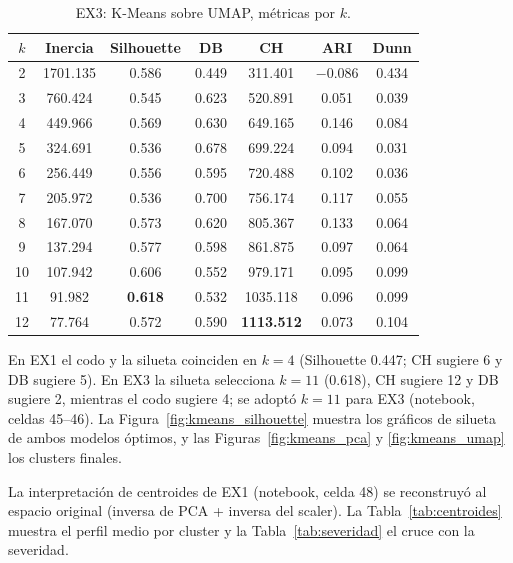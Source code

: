 \documentclass[11pt,a4paper]{article}
\begin{document}
\begin{table}[H]
  \centering
  \caption{EX3: K-Means sobre UMAP, métricas por $k$.}
  \label{tab:kmeans_umap}
  \footnotesize
  \begin{tabular}{@{}ccccccc@{}}
    \toprule
    $k$ & \textbf{Inercia} & \textbf{Silhouette} & \textbf{DB} & \textbf{CH} & \textbf{ARI} & \textbf{Dunn} \\
    \midrule
    2 & 1701.135 & 0.586 & 0.449 & 311.401 & $-0.086$ & 0.434 \\
    3 & 760.424 & 0.545 & 0.623 & 520.891 & 0.051 & 0.039 \\
    4 & 449.966 & 0.569 & 0.630 & 649.165 & 0.146 & 0.084 \\
    5 & 324.691 & 0.536 & 0.678 & 699.224 & 0.094 & 0.031 \\
    6 & 256.449 & 0.556 & 0.595 & 720.488 & 0.102 & 0.036 \\
    7 & 205.972 & 0.536 & 0.700 & 756.174 & 0.117 & 0.055 \\
    8 & 167.070 & 0.573 & 0.620 & 805.367 & 0.133 & 0.064 \\
    9 & 137.294 & 0.577 & 0.598 & 861.875 & 0.097 & 0.064 \\
    10 & 107.942 & 0.606 & 0.552 & 979.171 & 0.095 & 0.099 \\
    11 & 91.982 & \textbf{0.618} & 0.532 & 1035.118 & 0.096 & 0.099 \\
    12 & 77.764 & 0.572 & 0.590 & \textbf{1113.512} & 0.073 & 0.104 \\
    \bottomrule
  \end{tabular}
\end{table}

En EX1 el codo y la silueta coinciden en $k=4$ (Silhouette 0.447; CH sugiere 6 y DB sugiere
5). En EX3 la silueta selecciona $k=11$ (0.618), CH sugiere 12 y DB sugiere 2, mientras el
codo sugiere 4; se adoptó $k=11$ para EX3 (notebook, celdas 45--46). La Figura~\ref{fig:kmeans_silhouette}
muestra los gráficos de silueta de ambos modelos óptimos, y las Figuras~\ref{fig:kmeans_pca}
y \ref{fig:kmeans_umap} los clusters finales.

La interpretación de centroides de EX1 (notebook, celda 48) se reconstruyó al espacio
original (inversa de PCA + inversa del scaler). La Tabla~\ref{tab:centroides} muestra el
perfil medio por cluster y la Tabla~\ref{tab:severidad} el cruce con la severidad.
\end{document}
